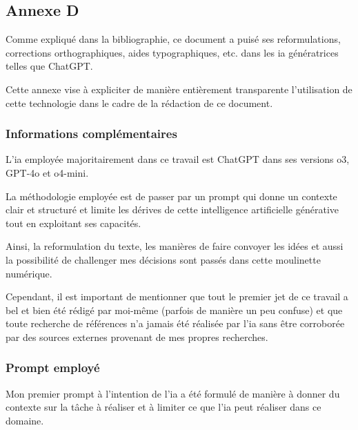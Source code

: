 \subsection{Annexe D} \label{sec:annexes_d}
Comme expliqué dans la bibliographie, ce document a puisé ses reformulations, corrections orthographiques, aides typographiques, etc. dans les \acrshort{ia} génératrices telles que ChatGPT.

Cette annexe vise à expliciter de manière entièrement transparente l'utilisation de cette technologie dans le cadre de la rédaction de ce document.

\subsubsection{Informations complémentaires}
L'\acrfull{ia} employée majoritairement dans ce travail est ChatGPT dans ses versions o3, GPT-4o et o4-mini.

La méthodologie employée est de passer par un prompt qui donne un contexte clair et structuré et limite les dérives de cette intelligence artificielle générative tout en exploitant ses capacités.

Ainsi, la reformulation du texte, les manières de faire convoyer les idées et aussi la possibilité de challenger mes décisions sont passés dans cette moulinette numérique.

Cependant, il est important de mentionner que tout le premier jet de ce travail a bel et bien été rédigé par moi-même (parfois de manière un peu confuse) et que toute recherche de références n'a jamais été réalisée par l'\acrshort{ia} sans être corroborée par des sources externes provenant de mes propres recherches.

\subsubsection{Prompt employé}
Mon premier prompt à l'intention de l'\acrshort{ia} a été formulé de manière à donner du contexte sur la tâche à réaliser et à limiter ce que l'\acrshort{ia} peut réaliser dans ce domaine.

